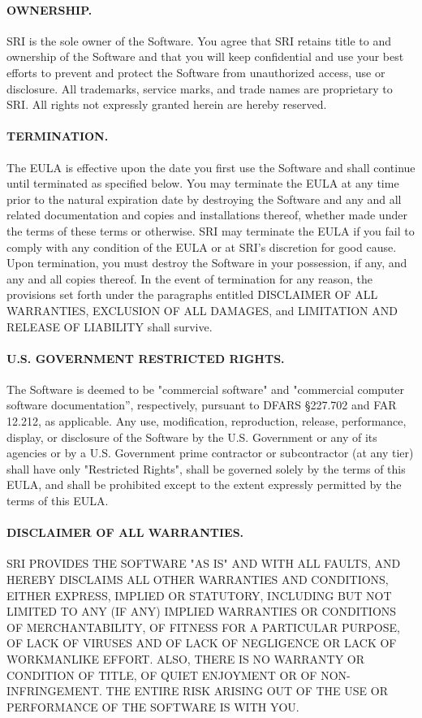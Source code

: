 \documentclass[11pt,twoside,fleqn,openright,titlepage]{cslreport}
\begin{document}
\begin{small}
\paragraph{OWNERSHIP.}  SRI is the sole owner of the Software.  You
agree that SRI retains title to and ownership of the Software and that
you will keep confidential and use your best efforts to prevent and
protect the Software from unauthorized access, use or disclosure.  All
trademarks, service marks, and trade names are proprietary to SRI.
All rights not expressly granted herein are hereby reserved.

\paragraph{TERMINATION.}  The  EULA is effective upon  the date you
first  use  the  Software  and  shall  continue  until  terminated  as
specified below.  You may terminate the  EULA at any time prior to the
natural expiration  date by  destroying the Software  and any  and all
related documentation  and copies  and installations  thereof, whether
made under the  terms of these terms or otherwise.   SRI may terminate
the EULA if  you fail to comply  with any condition of the  EULA or at
SRI's discretion for  good cause.  Upon termination,  you must destroy
the  Software in  your  possession, if  any, and  any  and all  copies
thereof.  In the  event of termination for any  reason, the provisions
set forth under the paragraphs  entitled DISCLAIMER OF ALL WARRANTIES,
EXCLUSION  OF ALL  DAMAGES, and  LIMITATION AND  RELEASE OF  LIABILITY
shall survive.

\paragraph{U.S. GOVERNMENT RESTRICTED  RIGHTS.}  The  Software is
deemed to  be "commercial software" and  "commercial computer software
documentation'', respectively,  pursuant to  DFARS \S 227.702  and FAR
12.212, as  applicable. Any use, modification,  reproduction, release,
performance,   display,  or   disclosure  of   the  Software   by  the
U.S. Government or  any of its agencies or by  a U.S. Government prime
contractor or subcontractor (at any  tier) shall have only "Restricted
Rights", shall be governed solely by the terms of this EULA, and shall
be prohibited except to the extent expressly permitted by the terms of
this EULA.

\paragraph{DISCLAIMER OF ALL  WARRANTIES.}  SRI PROVIDES THE SOFTWARE
  "AS  IS"  AND  WITH  ALL  FAULTS, AND  HEREBY  DISCLAIMS  ALL  OTHER
WARRANTIES  AND  CONDITIONS,  EITHER EXPRESS,  IMPLIED  OR  STATUTORY,
INCLUDING  BUT NOT  LIMITED  TO  ANY (IF  ANY)  IMPLIED WARRANTIES  OR
CONDITIONS OF MERCHANTABILITY, OF FITNESS FOR A PARTICULAR PURPOSE, OF
LACK  OF VIRUSES  AND OF  LACK OF  NEGLIGENCE OR  LACK OF  WORKMANLIKE
EFFORT.  ALSO,  THERE IS NO WARRANTY  OR CONDITION OF TITLE,  OF QUIET
ENJOYMENT OR OF NON-INFRINGEMENT.  THE  ENTIRE RISK ARISING OUT OF THE
USE OR PERFORMANCE OF THE SOFTWARE IS WITH YOU.


\end{small}
\end{document}
